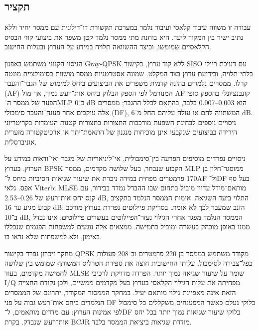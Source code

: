 \begin{otherlanguage}{hebrew}
\chapter*{\RaggedLeft תקציר}
\end{otherlanguage}
\label{sec:abstract-hebrew}

\begin{otherlanguage}{hebrew}
\begin{justify}
עבודה זו משווה עיבוד קלאסי ועיבוד נלמד במערכת תקשורת דו־דילוגית עם ממסר יחיד וללא נתיב ישיר בין המקור ליעד. היא בוחנת מתי ממסר נלמד קטן משפר את ביצועי קווי הבסיס הקלאסיים שמומשו, וכיצד ההשוואה תלויה במידע על הערוץ ובעלות החישוב.

הניסוי הקנוני משתמש באפנון \textenglish{Gray-QPSK} ללא קוד ערוץ, בקישור \textenglish{SISO} עם דעיכת ריילי בלתי־תלויה, ובידיעת ערוץ בצד המקלט. שמונה אסטרטגיות ממסר מושוות בסימולציית מונטה קרלו. ממסרים נלמדים בהזנה קדמית משפרים את הביצועים ביחס למימוש של הגבר־והעבר (\textenglish{AF}) המנורמל לפי הספק הבלוק ביחס אות־רעש נמוך, אך מול \textenglish{AF} קונבנציונלי בהספק סופי הפער של ממסר ה־\textenglish{MLP} ב־\textenglish{0 dB} הוא \textenglish{0.003--0.007} בלבד, בהתאם לכלל ההגבר; ממסרים אלה עוקבים אחר פענח־והעבר סימבולי (\textenglish{DF}), המשתווה להם או עולה עליהם החל מ־\textenglish{6 dB}. ניסויים נוספים לבחינת השפעת מורכבות התצורות בתצורות קטנות העומדות בקריטריוני הירידה בביצועים שנקבעו אינן מוכיחות מנגנון של התאמת־יתר או ארכיטקטורה מזערית אוניברסלית.

ניסויים נפרדים מוסיפים הפרעה בין־סימבולית, אי־ליניאריות של מגבר ואי־ודאות במידע על הערוץ. בערוץ \textenglish{BPSK} הקבוע שנבחר, בעל שלושה מקדמים, ממסר \textenglish{MLP} ממוסגר־חלון בן 170 פרמטרים מפחית במידה ניכרת את שיעור שגיאות הסיביות ביחס ל־\textenglish{AF} ול־\textenglish{DF} בעל סף אפס. גלאי \textenglish{Viterbi MLSE} מותאם־מודל עדיין מוביל בתחום שבו ההבדל נמדד בבירור, עם קנס יחס אות־רעש של \textenglish{0.26--2.53 dB}, התלוי ביעד השגיאה. אימות הממסר הנלמד בתקציב קבוע מגיע עד \textenglish{16 dB}; הזנב שמעבר לכך לא אומת. בסריקת פיילוטים נפרדת בערוץ מורכב ב־\textenglish{10 dB}, הממסר הנלמד מפגר אחרי הגילוי נעזר־הפיילוטים בעשרים פיילוטים, אינו נבדל ממנו באופן מובהק בעשרה ומוביל בחמישה. ממצאים אלה נוגעים למשפחות הפגמים שנכללו באימון, ולא למשפחות שלא נראו בו.

מחקר זיכרון נפרד בקישור \textenglish{QPSK} מקודד משתמש בממסר בן 220 פרמטרים וב־208 פעולות כפל־צבירה לסימבול. עלותו החישובית חוצה את ספירת הטרליס המשותף שמומש בין שלושה לחמישה מקדמים, בעוד \textenglish{MLSE} שומר על שיעור שגיאה נמוך יותר. הפרדה מדויקת לרכיבי \textenglish{I/Q} מפחיתה את עלות הגילוי הקלאסי בערוץ בעל מקדמים ממשיים, ולכן נקודת החצייה הזאת אינה מאפיינת גילוי מותאם יעיל. במחקר הממסור המקודד, יתרונם של הממסרים הנלמדים ביחס אות־רעש גבוה על פני \textenglish{DF} בלוקי נעלם כאשר המפענחים משקללים כל סימבול לפי אמינות הערוץ: עם מדדים מותאמים, ל־\textenglish{DF} בלוקי שיעור שגיאות נמוך יותר בכל יחס אות־רעש שנבדק. בקרת \textenglish{BCJR} מודדת שגיאות ביציאת הממסר בלבד.


\end{justify}
\end{otherlanguage}
